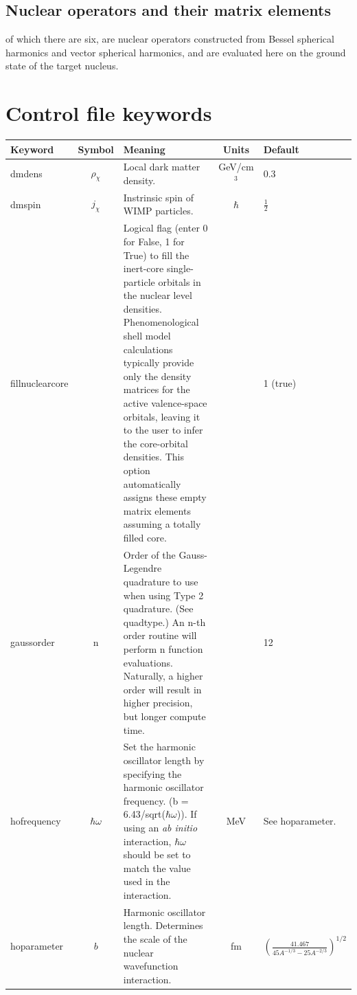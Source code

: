 \documentclass[11pt]{article}
\begin{document}
\subsection{Nuclear operators and their matrix elements}
of which there are six, are nuclear operators constructed from Bessel 
spherical harmonics and vector spherical harmonics, and are evaluated here on 
the ground state of the target nucleus.

\section{Control file keywords}

\begin{longtable}{| l | c | p{2.5in} | c | l | }
  \hline Keyword & Symbol & Meaning & Units & Default \\

  \hline dmdens & $\rho_\chi$ & Local dark matter density. & GeV/cm$^3$ & 0.3\\

  \hline dmspin & $j_\chi$ & Instrinsic spin of WIMP particles. & $\hbar$ &
  $\frac{1}{2}$ \\

  \hline fillnuclearcore & & Logical flag (enter 0 for False, 1 for True) to fill the
  inert-core single-particle orbitals in the nuclear level densities.
  Phenomenological shell model calculations typically provide only the density
  matrices for the active valence-space orbitals, leaving it to the user to
  infer the core-orbital densities. This option automatically assigns these
  empty matrix elements assuming a totally filled core. & & 1 (true)\\
  
  \hline gaussorder & n & Order of the Gauss-Legendre quadrature to use when using Type 2 quadrature. (See quadtype.) An n-th order routine will perform n function evaluations.  Naturally, a higher order will result in higher precision, but longer compute time. & & 12\\

  \hline hofrequency & $\hbar \omega$ & Set the harmonic oscillator length by
  specifying the harmonic oscillator frequency. (b = 6.43/sqrt($\hbar\omega$)).
  If using an \textit{ab initio} interaction, $\hbar \omega$ should be set to
  match the value used in the interaction.
              & MeV & See hoparameter.\\

  \hline hoparameter & $b$ & Harmonic oscillator length. Determines the scale of the
  nuclear wavefunction interaction. & fm &
  $(\frac{41.467}{45A^{-1/3}-25A^{-2/3}})^{1/2}$  \\


\end{longtable}
\end{document}
